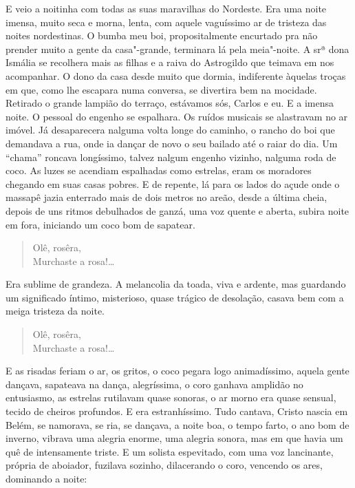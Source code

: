 E veio a noitinha com todas as suas maravilhas do Nordeste. Era uma
noite imensa, muito seca e morna, lenta, com aquele vaguíssimo ar de
tristeza das noites nordestinas. O bumba meu boi, propositalmente
encurtado pra não prender muito a gente da casa"-grande, terminara lá
pela meia"-noite. A srª dona Ismália se recolhera mais as filhas e a
raiva do Astrogildo que teimava em nos acompanhar. O dono da casa desde
muito que dormia, indiferente àquelas troças em que, como lhe escapara
numa conversa, se divertira bem na mocidade. Retirado o grande lampião
do terraço, estávamos sós, Carlos e eu. E a imensa noite. O pessoal do
engenho se espalhara. Os ruídos musicais se alastravam no ar imóvel. Já
desaparecera nalguma volta longe do caminho, o rancho do boi que
demandava a rua, onde ia dançar de novo o seu bailado até o raiar do
dia. Um ``chama'' roncava longíssimo, talvez nalgum engenho vizinho,
nalguma roda de coco. As luzes se acendiam espalhadas como estrelas,
eram os moradores chegando em suas casas pobres. E de repente, lá para
os lados do açude onde o massapê jazia enterrado mais de dois metros no
areão, desde a última cheia, depois de uns ritmos debulhados de ganzá,
uma voz quente e aberta, subira noite em fora, iniciando um coco bom de
sapatear.

\begin{verse}
Olê, rosêra,\\
Murchaste a rosa!\ldots{}
\end{verse}

Era sublime de grandeza. A melancolia da toada, viva e ardente, mas
guardando um significado íntimo, misterioso, quase trágico de desolação,
casava bem com a meiga tristeza da noite.

\begin{verse}
Olê, rosêra,\\
Murchaste a rosa!\ldots{}
\end{verse}

E as risadas feriam o ar, os gritos, o coco pegara logo animadíssimo,
aquela gente dançava, sapateava na dança, alegríssima, o coro ganhava
amplidão no entusiasmo, as estrelas rutilavam quase sonoras, o ar morno
era quase sensual, tecido de cheiros profundos. E era estranhíssimo.
Tudo cantava, Cristo nascia em Belém, se namorava, se ria, se dançava, a
noite boa, o tempo farto, o ano bom de inverno, vibrava uma alegria
enorme, uma alegria sonora, mas em que havia um quê de intensamente
triste. E um solista espevitado, com uma voz lancinante, própria de
aboiador, fuzilava sozinho, dilacerando o coro, vencendo os ares,
dominando a noite:

